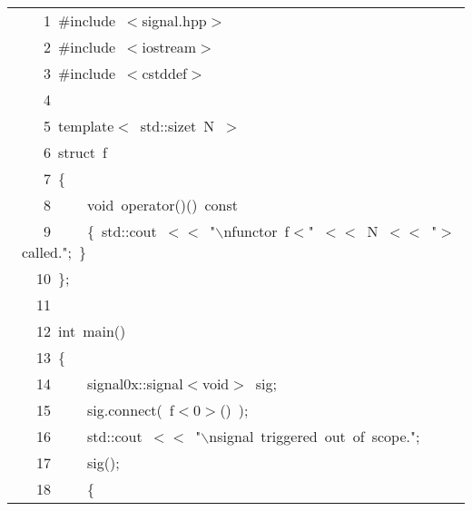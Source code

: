 \documentclass[9pt,onside,a4paper]{article}
\newcommand{\hlstd}[1]{\textcolor[rgb]{0.2,0,0.4}{#1}}
\newcommand{\hlnum}[1]{\textcolor[rgb]{0.2,0.73,0.02}{#1}}
\newcommand{\hlesc}[1]{\textcolor[rgb]{0.65,0.09,0.38}{#1}}
\newcommand{\hlstr}[1]{\textcolor[rgb]{0.09,0.38,0.65}{#1}}
\newcommand{\hlppc}[1]{\textcolor[rgb]{0.33,0.45,0.69}{#1}}
\newcommand{\hlopt}[1]{\textcolor[rgb]{0.33,0.33,0.33}{#1}}
\newcommand{\hllin}[1]{\textcolor[rgb]{0.6,0.6,0.6}{#1}}
\newcommand{\hlkwb}[1]{\textcolor[rgb]{0.96,0.55,0.14}{#1}}
\newcommand{\hlkwc}[1]{\textcolor[rgb]{0,0,1}{#1}}
\newcommand{\hlkwd}[1]{\textcolor[rgb]{0.82,0.11,0.93}{#1}}
\begin{document}
\ttfamily
\begin{center}
\begin{xtabular}{||l||}
\hline
\hlstd{}\hllin{\ \ \ \ 1\ }\hlppc{\#include\ $<$signal.hpp$>$}\\
\hllin{\ \ \ \ 2\ }\hlstd{}\hlppc{\#include\ $<$iostream$>$}\\
\hllin{\ \ \ \ 3\ }\hlstd{}\hlppc{\#include\ $<$cstddef$>$}\\
\hllin{\ \ \ \ 4\ }\hlstd{}\\
\hllin{\ \ \ \ 5\ }\hlkwc{template}\hlstd{}\hlopt{$<$\ }\hlstd{std}\hlopt{::}\hlstd{}\hlkwb{size\textunderscore t\ }\hlstd{N\ }\hlopt{$>$}\\
\hllin{\ \ \ \ 6\ }\hlstd{}\hlkwb{struct\ }\hlstd{f}\\
\hllin{\ \ \ \ 7\ }\hlopt{\{}\\
\hllin{\ \ \ \ 8\ }\hlstd{}\hlstd{\ \ \ \ }\hlstd{}\hlkwb{void\ }\hlstd{}\hlkwc{operator}\hlstd{}\hlopt{()()\ }\hlstd{}\hlkwb{const\ }\\
\hllin{\ \ \ \ 9\ }\hlstd{}\hlstd{\ \ \ \ }\hlstd{}\hlopt{\{\ }\hlstd{std}\hlopt{::}\hlstd{cout\ }\hlopt{$<$$<$\ }\hlstd{}\hlstr{"}\hlesc{$\backslash$n}\hlstr{functor\ f$<$"}\hlstd{\ }\hlopt{$<$$<$\ }\hlstd{N\ }\hlopt{$<$$<$\ }\hlstd{}\hlstr{"$>$\ called."}\hlstd{}\hlopt{;\ \}}\\
\hllin{\ \ \ 10\ }\hlstd{}\hlopt{\};}\\
\hllin{\ \ \ 11\ }\hlstd{}\\
\hllin{\ \ \ 12\ }\hlkwb{int\ }\hlstd{}\hlkwd{main}\hlstd{}\hlopt{()}\\
\hllin{\ \ \ 13\ }\hlstd{}\hlopt{\{}\\
\hllin{\ \ \ 14\ }\hlstd{}\hlstd{\ \ \ \ }\hlstd{signal0x}\hlopt{::}\hlstd{signal}\hlopt{$<$}\hlstd{}\hlkwb{void}\hlstd{}\hlopt{$>$\ }\hlstd{sig}\hlopt{;}\\
\hllin{\ \ \ 15\ }\hlstd{}\hlstd{\ \ \ \ }\hlstd{sig}\hlopt{.}\hlstd{}\hlkwd{connect}\hlstd{}\hlopt{(\ }\hlstd{f}\hlopt{$<$}\hlstd{}\hlnum{0}\hlstd{}\hlopt{$>$()\ );}\\
\hllin{\ \ \ 16\ }\hlstd{}\hlstd{\ \ \ \ }\hlstd{std}\hlopt{::}\hlstd{cout\ }\hlopt{$<$$<$\ }\hlstd{}\hlstr{"}\hlesc{$\backslash$n}\hlstr{signal\ triggered\ out\ of\ scope."}\hlstd{}\hlopt{;}\\
\hllin{\ \ \ 17\ }\hlstd{}\hlstd{\ \ \ \ }\hlstd{}\hlkwd{sig}\hlstd{}\hlopt{();}\\
\hllin{\ \ \ 18\ }\hlstd{}\hlstd{\ \ \ \ }\hlstd{}\hlopt{\{}\\

\end{xtabular}
\end{center}
\end{document}
